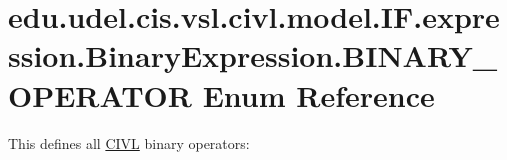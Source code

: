 \hypertarget{enumedu_1_1udel_1_1cis_1_1vsl_1_1civl_1_1model_1_1IF_1_1expression_1_1BinaryExpression_1_1BINARY__OPERATOR}{}\section{edu.\+udel.\+cis.\+vsl.\+civl.\+model.\+I\+F.\+expression.\+Binary\+Expression.\+B\+I\+N\+A\+R\+Y\+\_\+\+O\+P\+E\+R\+A\+T\+O\+R Enum Reference}
\label{enumedu_1_1udel_1_1cis_1_1vsl_1_1civl_1_1model_1_1IF_1_1expression_1_1BinaryExpression_1_1BINARY__OPERATOR}


This defines all \hyperlink{classedu_1_1udel_1_1cis_1_1vsl_1_1civl_1_1CIVL}{C\+I\+V\+L} binary operators\+: ~\newline
  


